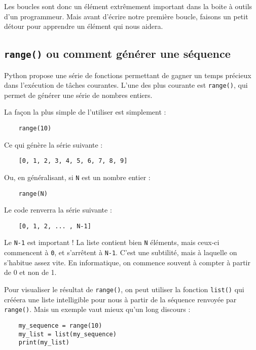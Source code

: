 Les boucles sont donc un élément extrêmement important dans la boite à outils d'un programmeur. Mais avant d'écrire notre première boucle, faisons un petit détour pour apprendre un élément qui nous aidera.

\subsection{\texttt{range()} ou comment générer une séquence}

Python propose une série de fonctions permettant de gagner un temps précieux dans l'exécution de tâches courantes. L'une des plus courante est \texttt{range()}, qui permet de générer une série de nombres entiers.

La façon la plus simple de l'utiliser est simplement :

\begin{lstlisting}
    range(10)
\end{lstlisting}

Ce qui génère la série suivante :

\begin{lstlisting}
    [0, 1, 2, 3, 4, 5, 6, 7, 8, 9]
\end{lstlisting}

Ou, en généralisant, si \texttt{N} est un nombre entier :

\begin{lstlisting}
    range(N)
\end{lstlisting}

Le code renverra la série suivante :

\begin{lstlisting}
    [0, 1, 2, ... , N-1]
\end{lstlisting}

Le \texttt{N-1} est important ! La liste contient bien \texttt{N} éléments, mais ceux-ci commencent à \texttt{0}, et s'arrêtent à \texttt{N-1}. C'est une subtilité, mais à laquelle on s'habitue assez vite. En informatique, on commence souvent à compter à partir de 0 et non de 1.

Pour visualiser le résultat de \texttt{range()}, on peut utiliser la fonction \texttt{list()} qui crééera une liste intelligible pour nous à partir de la séquence renvoyée par \texttt{range()}. Mais un exemple vaut mieux qu'un long discours :

\begin{lstlisting}
    my_sequence = range(10)
    my_list = list(my_sequence)
    print(my_list)
\end{lstlisting}

